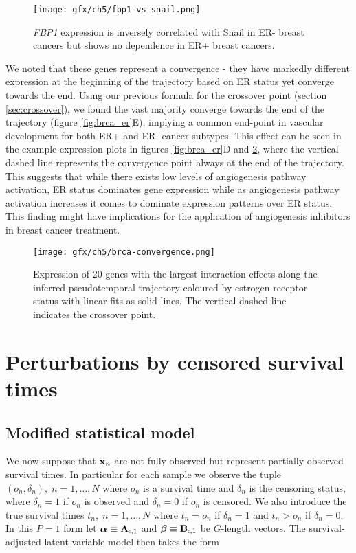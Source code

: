 \begin{figure}
  \centering
   \texttt{[image: gfx/ch5/fbp1-vs-snail.png]}
   \caption{\emph{FBP1} expression is inversely correlated with Snail in ER- breast cancers but shows no dependence in ER+ breast cancers.}
	\label{fig:fbp1-vs-snail}
\end{figure}

We noted that these genes represent a convergence - they have markedly different expression at the beginning of the trajectory based on ER status yet converge towards the end. Using our previous formula for the crossover point (section \ref{sec:crossover}), we found the vast majority converge towards the end of the trajectory (figure \ref{fig:brca_er}E), implying a common end-point in vascular development for both ER+ and ER- cancer subtypes.
This effect can be seen in the example expression plots in figures \ref{fig:brca_er}D and \ref{fig:brca_convergence}, where the vertical dashed line represents the convergence point always at the end of the trajectory.
This suggests that while there exists low levels of angiogenesis pathway activation, ER status dominates gene expression while as angiogenesis pathway activation increases it comes to dominate expression patterns over ER status. This finding might have implications for the application of angiogenesis inhibitors in breast cancer treatment.

\begin{figure}
   \texttt{[image: gfx/ch5/brca-convergence.png]}
   \caption{Expression of 20 genes with the largest interaction effects along the inferred pseudotemporal trajectory coloured by estrogen receptor status with linear fits as solid lines. The vertical dashed line indicates the crossover point.}
	\label{fig:brca_convergence}
\end{figure}


\section{Perturbations by censored survival times} \label{sec:survival}

\subsection{Modified statistical model}


We now suppose that $\mathbf{x}_n$ are not fully observed but represent partially observed survival times. In particular for each sample we observe the tuple $(o_n, \delta_n), \; n = 1, \ldots, N$ where $o_n$ is a survival time and $\delta_n$ is the censoring status, where $\delta_n = 1$ if $o_n$ is observed and $\delta_n = 0$ if $o_n$ is censored. We also introduce the true survival times $t_n, \; n = 1, \ldots, N$
where $t_n = o_n$ if $\delta_n = 1$ and $t_n > o_n$ if $\delta_n = 0$. In this $P = 1$ form let $\bm{\alpha} \equiv \mathbf{A}_{:,1}$ and $\bm{\beta} \equiv \mathbf{B}_{:,1}$ be $G$-length vectors. The survival-adjusted latent variable model then takes the form

